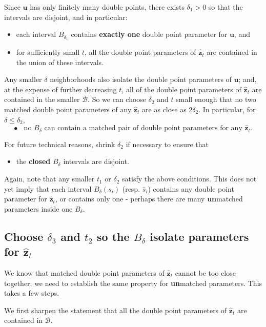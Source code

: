\documentclass[12pt]{article}
\numberwithin{equation}{subsection}
\theoremstyle{definition}
\numberwithin{lem}{section}
\def\uu{\mathbf{u}}
\def\zhat{\mathbf{\hat{z}}}
\begin{document}
Since $\uu$ has only finitely many double points, there exists $\delta_1>0$ so that the intervals are disjoint, and in particular:
\begin{itemize}
\item each interval $B_{\delta_1}$ contains {\bf exactly one} double point parameter for $\uu$, and
\item for sufficiently small $t$, all the double point parameters of $\zhat_t$ are contained in the union of these intervals.
\end{itemize}
 Any smaller $\delta$ neighborhoods also isolate the double point parameters of $\uu$; and, at the expense of further decreasing $t$, all of the double point parameters of $\zhat_t$ are contained in the smaller $\mathscr{B}$. So we can choose $\delta_2$ and $t$ small enough that no two matched double point parameters of any $\zhat_t$ are as close as $2\delta_2$. In particular, for $\delta \leq \delta_2$, 
\begin{equation}
\bullet \;\; \text{ no } B_\delta  \text{ can contain a matched pair of double point parameters for any } \zhat_t.
  \label{NoCloseMatchedParameters}
 \end{equation}
 
For future technical reasons, shrink $\delta_2$ if necessary to ensure that 
 \begin{itemize}
 \item the {\bf closed} $B_\delta$ intervals are disjoint.
 \end{itemize}
 
 Again, note that any smaller $t_1$ or $\delta_2$ satisfy the above conditions. This does not yet imply that each interval $B_\delta(s_i)$ (resp. $\bar{s}_i$) contains any  double point parameter for $\zhat_t$, or contains only one - perhaps there are many {\bf{un}}matched parameters inside one $B_\delta$.
 
 
 \subsection{Choose $\delta_3$ and $t_2$ so the $B_\delta$ isolate parameters for $\zhat_t$}
 \label{IntervalsIsolateDoublePoints}
 We know that matched double point parameters of $\zhat_t$ cannot be too close together; we need to establish the same property for {\bf{un}}matched parameters.  This takes a few steps.
 
 We first sharpen the statement that all the double point parameters of $\zhat_t$ are contained in $\mathscr{B}$.
 
\end{document}
